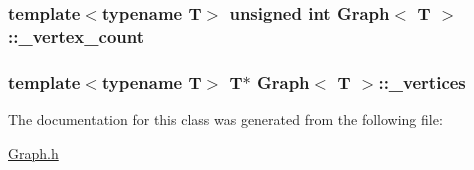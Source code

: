 \subsubsection[{\+\_\+vertex\+\_\+count}]{\setlength{\rightskip}{0pt plus 5cm}template$<$typename T$>$ unsigned int {\bf Graph}$<$ T $>$\+::\+\_\+vertex\+\_\+count\hspace{0.3cm}{\ttfamily [private]}}\label{class_graph_a4e7aab8b61dd4b59cc7e02f32cac0529}
\hypertarget{class_graph_a049cc274f3726e8b202f1fcf1145be80}{}
\subsubsection[{\+\_\+vertices}]{\setlength{\rightskip}{0pt plus 5cm}template$<$typename T$>$ T$\ast$ {\bf Graph}$<$ T $>$\+::\+\_\+vertices\hspace{0.3cm}{\ttfamily [private]}}\label{class_graph_a049cc274f3726e8b202f1fcf1145be80}


The documentation for this class was generated from the following file\+:\begin{DoxyCompactItemize}
\item 
\hyperlink{_graph_8h}{Graph.\+h}\end{DoxyCompactItemize}
